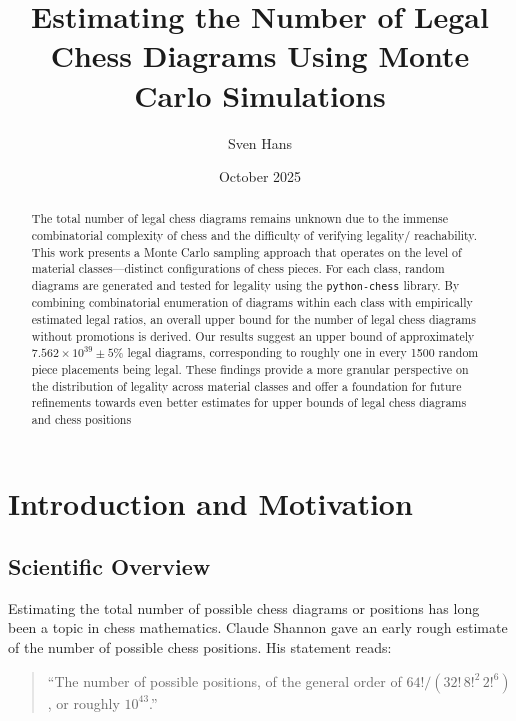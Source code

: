 \documentclass[12pt]{article}
\title{Estimating the Number of Legal Chess Diagrams Using Monte Carlo Simulations}
\author{Sven Hans}
\date{October 2025}
\begin{document}
\maketitle

\begin{abstract}
The total number of legal chess diagrams remains unknown due to the immense combinatorial complexity of chess and the difficulty of verifying legality/ reachability. This work presents a Monte Carlo sampling approach that operates on the level of material classes—distinct configurations of chess pieces. For each class, random diagrams are generated and tested for legality using the \texttt{python-chess} library. By combining combinatorial enumeration of diagrams within each class with empirically estimated legal ratios, an overall upper bound for the number of legal chess diagrams without promotions is derived. Our results suggest an upper bound of approximately $7.562\times10^{39}\pm5\percent$ legal diagrams, corresponding to roughly one in every 1500 random piece placements being legal. These findings provide a more granular perspective on the distribution of legality across material classes and offer a foundation for future refinements towards even better estimates for upper bounds of legal chess diagrams and chess positions 
\end{abstract}

\section{Introduction and Motivation}

\subsection{Scientific Overview}

Estimating the total number of possible chess diagrams or positions has long been a topic in chess mathematics. Claude Shannon \cite{shannon1950} gave an early rough estimate of the number of possible chess positions. His statement reads:

\begin{quote}
``The number of possible positions, of the general order of 
$64! / (32! \, 8!^2 \, 2!^6)$, or roughly $10^{43}$.''
\end{quote}
\end{document}
